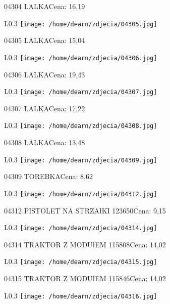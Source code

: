 04304 LALKACena: 16,19\newline
\begin{wrapfigure}{L}{0.3\textwidth}
\texttt{[image: /home/dearn/zdjecia/04305.jpg]}
\end{wrapfigure}
04305 LALKACena: 15,04\newline
\begin{wrapfigure}{L}{0.3\textwidth}
\texttt{[image: /home/dearn/zdjecia/04306.jpg]}
\end{wrapfigure}
04306 LALKACena: 19,43\newline
\begin{wrapfigure}{L}{0.3\textwidth}
\texttt{[image: /home/dearn/zdjecia/04307.jpg]}
\end{wrapfigure}
04307 LALKACena: 17,22\newline
\begin{wrapfigure}{L}{0.3\textwidth}
\texttt{[image: /home/dearn/zdjecia/04308.jpg]}
\end{wrapfigure}
04308 LALKACena: 13,48\newline
\begin{wrapfigure}{L}{0.3\textwidth}
\texttt{[image: /home/dearn/zdjecia/04309.jpg]}
\end{wrapfigure}
04309 TOREBKACena: 8,62\newline
\begin{wrapfigure}{L}{0.3\textwidth}
\texttt{[image: /home/dearn/zdjecia/04312.jpg]}
\end{wrapfigure}
04312 PISTOLET NA STRZAłKI                            123650Cena: 9,15\newline
\begin{wrapfigure}{L}{0.3\textwidth}
\texttt{[image: /home/dearn/zdjecia/04314.jpg]}
\end{wrapfigure}
04314 TRAKTOR Z MODUłEM                              115808Cena: 14,02\newline
\begin{wrapfigure}{L}{0.3\textwidth}
\texttt{[image: /home/dearn/zdjecia/04315.jpg]}
\end{wrapfigure}
04315 TRAKTOR Z MODUłEM                              115846Cena: 14,02\newline
\begin{wrapfigure}{L}{0.3\textwidth}
\texttt{[image: /home/dearn/zdjecia/04316.jpg]}
\end{wrapfigure}
